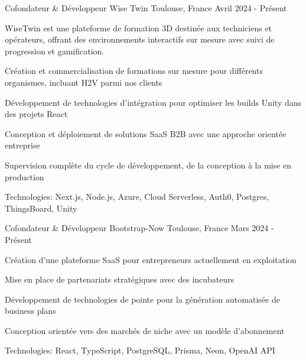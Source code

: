 


\begin{cventries}


\cventry
{Cofondateur \& Développeur} %
{Wise Twin} %
{Toulouse, France} %
{Avril 2024 - Présent} %
{ %
\begin{cvitems}
\item {WiseTwin est une plateforme de formation 3D destinée aux techniciens et opérateurs, offrant des environnements interactifs sur mesure avec suivi de progression et gamification.}
\item {Création et commercialisation de formations sur mesure pour différents organismes, incluant H2V parmi nos clients}
\item {Développement de technologies d'intégration pour optimiser les builds Unity dans des projets React}
\item {Conception et déploiement de solutions SaaS B2B avec une approche orientée entreprise}
\item {Supervision complète du cycle de développement, de la conception à la mise en production}
\item {Technologies: Next.js, Node.js, Azure, Cloud Serverless, Auth0, Postgres, ThingsBoard, Unity}
\end{cvitems}
}
\vspace{1.5em}


\cventry
{Cofondateur \& Développeur} %
{Bootstrap-Now} %
{Toulouse, France} %
{Mars 2024 - Présent} %
{ %
\begin{cvitems}
\item {Création d'une plateforme SaaS pour entrepreneurs actuellement en exploitation}
\item {Mise en place de partenariats stratégiques avec des incubateurs}
\item {Développement de technologies de pointe pour la génération automatisée de business plans}
\item {Conception orientée vers des marchés de niche avec un modèle d'abonnement}
\item {Technologies: React, TypeScript, PostgreSQL, Prisma, Neon, OpenAI API}
\end{cvitems}
}
\vspace{1.5em}


\end{cventries}
